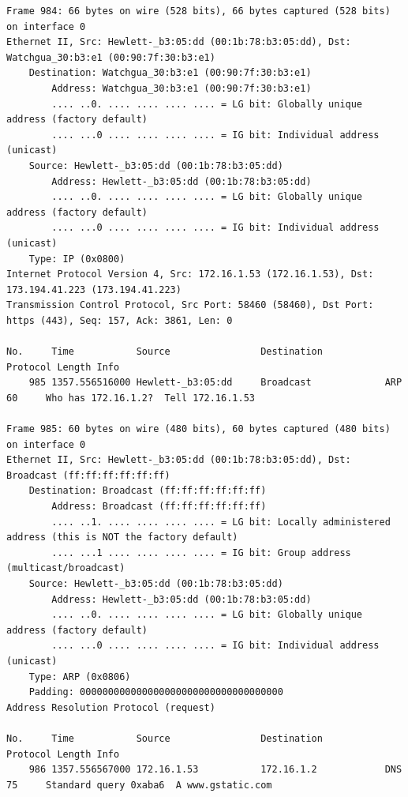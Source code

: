 \documentclass[a4paper,11pt]{article}
\begin{document}
\begin{lstlisting}
Frame 984: 66 bytes on wire (528 bits), 66 bytes captured (528 bits) on interface 0
Ethernet II, Src: Hewlett-_b3:05:dd (00:1b:78:b3:05:dd), Dst: Watchgua_30:b3:e1 (00:90:7f:30:b3:e1)
    Destination: Watchgua_30:b3:e1 (00:90:7f:30:b3:e1)
        Address: Watchgua_30:b3:e1 (00:90:7f:30:b3:e1)
        .... ..0. .... .... .... .... = LG bit: Globally unique address (factory default)
        .... ...0 .... .... .... .... = IG bit: Individual address (unicast)
    Source: Hewlett-_b3:05:dd (00:1b:78:b3:05:dd)
        Address: Hewlett-_b3:05:dd (00:1b:78:b3:05:dd)
        .... ..0. .... .... .... .... = LG bit: Globally unique address (factory default)
        .... ...0 .... .... .... .... = IG bit: Individual address (unicast)
    Type: IP (0x0800)
Internet Protocol Version 4, Src: 172.16.1.53 (172.16.1.53), Dst: 173.194.41.223 (173.194.41.223)
Transmission Control Protocol, Src Port: 58460 (58460), Dst Port: https (443), Seq: 157, Ack: 3861, Len: 0

No.     Time           Source                Destination           Protocol Length Info
    985 1357.556516000 Hewlett-_b3:05:dd     Broadcast             ARP      60     Who has 172.16.1.2?  Tell 172.16.1.53

Frame 985: 60 bytes on wire (480 bits), 60 bytes captured (480 bits) on interface 0
Ethernet II, Src: Hewlett-_b3:05:dd (00:1b:78:b3:05:dd), Dst: Broadcast (ff:ff:ff:ff:ff:ff)
    Destination: Broadcast (ff:ff:ff:ff:ff:ff)
        Address: Broadcast (ff:ff:ff:ff:ff:ff)
        .... ..1. .... .... .... .... = LG bit: Locally administered address (this is NOT the factory default)
        .... ...1 .... .... .... .... = IG bit: Group address (multicast/broadcast)
    Source: Hewlett-_b3:05:dd (00:1b:78:b3:05:dd)
        Address: Hewlett-_b3:05:dd (00:1b:78:b3:05:dd)
        .... ..0. .... .... .... .... = LG bit: Globally unique address (factory default)
        .... ...0 .... .... .... .... = IG bit: Individual address (unicast)
    Type: ARP (0x0806)
    Padding: 000000000000000000000000000000000000
Address Resolution Protocol (request)

No.     Time           Source                Destination           Protocol Length Info
    986 1357.556567000 172.16.1.53           172.16.1.2            DNS      75     Standard query 0xaba6  A www.gstatic.com


\end{lstlisting}
\end{document}
